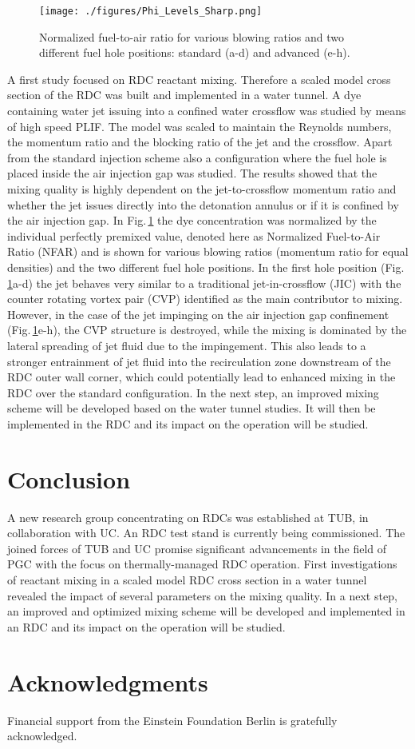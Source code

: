 \documentclass[]{aiaa-tc}%
\begin{document}
\begin{figure}[ht]
	\centering
 	\texttt{[image: ./figures/Phi\_Levels\_Sharp.png]}
 	\caption{Normalized fuel-to-air ratio for various blowing ratios and two different fuel hole positions: standard (a-d) and advanced (e-h).}
 	\label{fig:JIC}
\end{figure}

A first study focused on RDC reactant mixing. Therefore a scaled model cross section of the RDC was built and implemented in a water tunnel. A dye containing water jet issuing into a confined water crossflow was studied by means of high speed PLIF. The model was scaled to maintain the Reynolds numbers, the momentum ratio and the blocking ratio of the jet and the crossflow. Apart from the standard injection scheme also a configuration where the fuel hole is placed inside the air injection gap was studied. The results showed that the mixing quality is highly dependent on the jet-to-crossflow momentum ratio and whether the jet issues directly into the detonation annulus or if it is confined by the air injection gap. In Fig.\,\ref{fig:JIC} the dye concentration was normalized by the individual perfectly premixed value, denoted here as Normalized Fuel-to-Air Ratio (NFAR) and is shown for various blowing ratios (momentum ratio for equal densities) and the two different fuel hole positions. In the first hole position (Fig.\,\ref{fig:JIC}a-d) the jet behaves very similar to a traditional jet-in-crossflow (JIC) with the counter rotating vortex pair (CVP) identified as the main contributor to mixing. However, in the case of the jet impinging on the air injection gap confinement (Fig.\,\ref{fig:JIC}e-h), the CVP structure is destroyed, while the mixing is dominated by the lateral spreading of jet fluid due to the impingement. This also leads to a stronger entrainment of jet fluid into the recirculation zone downstream of the RDC outer wall corner, which could potentially lead to enhanced mixing in the RDC over the standard configuration. In the next step, an improved mixing scheme will be developed based on the water tunnel studies. It will then be implemented in the RDC and its impact on the operation will be studied.

\section{Conclusion}
A new research group concentrating on RDCs was established at TUB, in collaboration with UC. An RDC test stand is currently being commissioned. The joined forces of TUB and UC promise significant advancements in the field of PGC with the focus on thermally-managed RDC operation. First investigations of reactant mixing in a scaled model RDC cross section in a water tunnel revealed the impact of several parameters on the mixing quality. In a next step, an improved and optimized mixing scheme will be developed and implemented in an RDC and its impact on the operation will be studied.

\section*{Acknowledgments}
Financial support from the Einstein Foundation Berlin is gratefully acknowledged.



\end{document}
